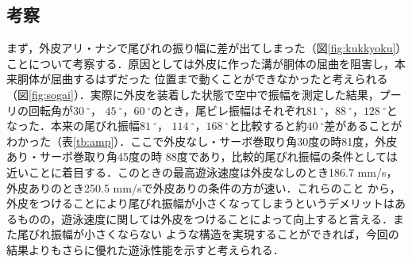 \newpage
\subsection{考察}
まず，外皮アリ・ナシで尾びれの振り幅に差が出てしまった（図\ref{fig:kukkyoku}）ことについて考察する．原因としては外皮に作った溝が胴体の屈曲を阻害し，本来胴体が屈曲するはずだった
位置まで動くことができなかったと考えられる（図\ref{fig:sogai}）．実際に外皮を装着した状態で空中で振幅を測定した結果，プーリの回転角が$30\:^\circ$，
$45\:^\circ$，$60\:^\circ$のとき，尾ビレ振幅はそれぞれ$81\:^\circ$，$88\:^\circ$，$128\:^\circ$となった．本来の尾びれ振幅$81\:^\circ$，
$114\:^\circ$，$168\:^\circ$と比較すると約$40\:^\circ$差があることがわかった（表\ref{tb:amp}）．ここで外皮なし・サーボ巻取り角30度の時81度，外皮あり・サーボ巻取り角45度の時
88度であり，比較的尾びれ振幅の条件としては近いことに着目する．このときの最高遊泳速度は外皮なしのとき186.7 mm/s，外皮ありのとき250.5 mm/sで外皮ありの条件の方が速い．これらのこと
から，外皮をつけることにより尾びれ振幅が小さくなってしまうというデメリットはあるものの，遊泳速度に関しては外皮をつけることによって向上すると言える．また尾びれ振幅が小さくならない
ような構造を実現することができれば，今回の結果よりもさらに優れた遊泳性能を示すと考えられる．

